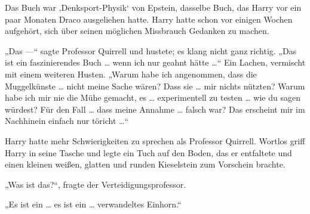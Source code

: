 Das Buch war ‚Denksport-Physik‘ von Epstein, dasselbe Buch, das Harry vor ein paar Monaten Draco ausgeliehen hatte. Harry hatte schon vor einigen Wochen aufgehört, sich über seinen möglichen Missbrauch Gedanken zu machen.

„Das —“ sagte Professor Quirrell und hustete; es klang nicht ganz richtig.
„Das ist ein faszinierendes Buch … wenn ich nur geahnt hätte …“
Ein Lachen, vermischt mit einem weiteren Husten.
„Warum habe ich angenommen, dass die Muggelkünste … nicht meine Sache wären? Dass sie … mir nichts nützten? Warum habe ich mir nie die Mühe gemacht, es … experimentell zu testen … wie du sagen würdest? Für den Fall … dass meine Annahme … falsch war? Das erscheint mir im Nachhinein einfach nur töricht …“

Harry hatte mehr Schwierigkeiten zu sprechen als Professor Quirrell. Wortlos griff Harry in seine Tasche und legte ein Tuch auf den Boden, das er entfaltete und einen kleinen weißen, glatten und runden Kieselstein zum Vorschein brachte.

„Was ist das?“, fragte der Verteidigungsprofessor.

„Es ist ein … es ist ein … verwandeltes Einhorn.“


